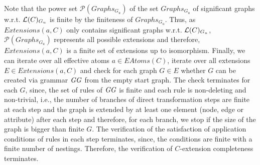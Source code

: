 \begin{enumerate}
  Note that the power set $\mathcal{P}(Graphs_{G_u})$ of the set $Graphs_{G_u}$ of significant graphs w.r.t. $\mathcal{L}(C)_{G_u}$ is finite by the finiteness of $Graphs_{G_u}$.
  Thus, as $Extensions(a,C)$ only contains significant graphs w.r.t. $\mathcal{L}(C)_{G_u}$, $\mathcal{P}(Graphs_{G_u})$ represents all possible extensions and therefore, $Extensions(a,C)$ is a finite set of extensions up to isomorphism.
  Finally, we can iterate over all effective atoms $a \in EAtoms(C)$, iterate over all extensions $E \in Extensions(a,C)$ and check for each graph $G \in E$ whether $G$ can be created via grammar $\mathit{GG}$ from the empty start graph.
  The check terminates for each $G$, since, the set of rules of $\mathit{GG}$ is finite and each rule is non-deleting and non-trivial, i.e., the number of branches of direct transformation steps are finite at each step and the graph is extended by at least one element (node, edge or attribute) after each step and therefore, for each branch, we stop if the size of the graph is bigger than finite $G$.
  The verification of the satisfaction of application conditions of rules in each step terminates, since, the conditions are finite with a finite number of nestings.
  Therefore, the verification of $C$-extension completeness terminates.
  

\end{enumerate}
